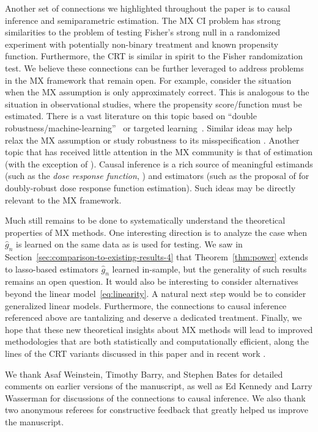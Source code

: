 \documentclass[ejs]{imsart}
\numberwithin{equation}{section}
\theoremstyle{plain}
\theoremstyle{definition}
\theoremstyle{remark}
\begin{document}
Another set of connections we highlighted throughout the paper is to causal inference and semiparametric estimation. The MX CI problem has strong similarities to the problem of testing Fisher's strong null in a randomized experiment with potentially non-binary treatment and known propensity function. Furthermore, the CRT is similar in spirit to the Fisher randomization test. We believe these connections can be further leveraged to address problems in the MX framework that remain open. For example, consider the situation when the MX assumption is only approximately correct. This is analogous to the situation in observational studies, where the propensity score/function must be estimated. There is a vast literature on this topic based on ``double robustness/machine-learning''~\citep{Chernozhukov2018} or targeted learning~\citep{VanderLaan2011}. Similar ideas may help relax the MX assumption \citep{Huang2019} or study robustness to its misspecification \citep{Barber2018}. Another topic that has received little attention in the MX community is that of estimation (with the exception of \cite{Zhang2020}). Causal inference is a rich source of meaningful estimands (such as the \textit{dose response function}, \cite{Hirano2004}) and estimators (such as the proposal of \citet{Kennedy2017} for doubly-robust dose response function estimation). Such ideas may be directly relevant to the MX framework.

Much still remains to be done to systematically understand the theoretical properties of MX methods. One interesting direction is to analyze the case when $\widehat g_n$ is learned on the same data as is used for testing. We saw in Section~\ref{sec:comparison-to-existing-results-4} that Theorem~\ref{thm:power} extends to lasso-based estimators $\widehat g_n$ learned in-sample, but the generality of such results remains an open question. It would also be interesting to consider alternatives beyond the linear model~\eqref{eq:linearity}. A natural next step would be to consider generalized linear models. Furthermore, the connections to causal inference referenced above are tantalizing and deserve a dedicated treatment. Finally, we hope that these new theoretical insights about MX methods will lead to improved methodologies that are both statistically and computationally efficient, along the lines of the CRT variants discussed in this paper and in recent work \citep{Liu2020}.


\begin{acks}[Acknowledgments]
   We thank Asaf Weinstein, Timothy Barry, and Stephen Bates for detailed comments on earlier versions of the manuscript, as well as Ed Kennedy and Larry Wasserman for discussions of the connections to causal inference. We also thank two anonymous referees for constructive feedback that greatly helped us improve the manuscript.
\end{acks}
\end{document}
